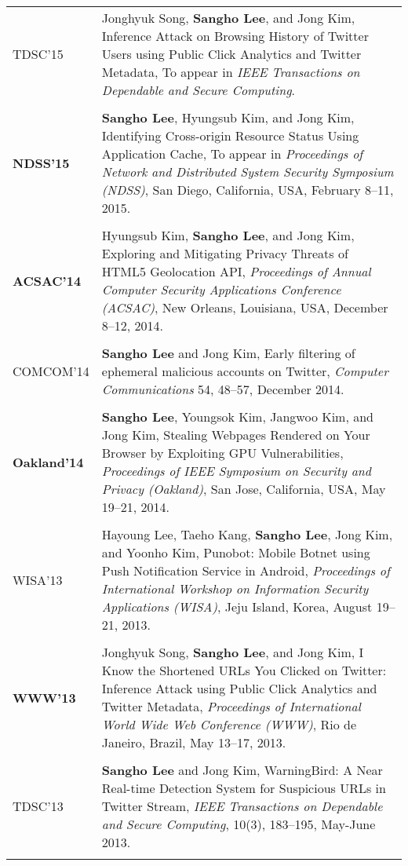 \documentclass[letterpaper]{article}
\begin{document}
\begin{longtable}{@{}p{0.8in}p{5.4in}@{}}
  TDSC'15 & Jonghyuk Song, {\bf Sangho Lee}, and Jong Kim, Inference Attack on Browsing History of Twitter Users using Public Click Analytics and Twitter Metadata, To appear in {\it IEEE Transactions on Dependable and Secure Computing}.\\\\
  \textbf{NDSS'15} & {\bf Sangho Lee}, Hyungsub Kim, and Jong Kim, Identifying Cross-origin Resource Status Using Application Cache, 
  To appear in {\em Proceedings of Network and Distributed System Security Symposium ({NDSS})}, San Diego, California, USA, February 8--11, 2015. \\\\
  \textbf{ACSAC'14} & Hyungsub Kim, {\bf Sangho Lee}, and Jong Kim, Exploring and Mitigating Privacy Threats of HTML5 Geolocation API, 
  {\em Proceedings of Annual Computer Security Applications Conference ({ACSAC})}, New Orleans, Louisiana, USA, December 8--12, 2014. \\\\
  COMCOM'14 & {\bf Sangho Lee} and Jong Kim, Early filtering of ephemeral malicious accounts on Twitter, 
  {\it Computer Communications} 54, 48--57, December 2014.\\\\
  \textbf{Oakland'14} & {\bf Sangho Lee}, Youngsok Kim, Jangwoo Kim, and Jong Kim, Stealing Webpages Rendered on Your Browser by Exploiting GPU Vulnerabilities, \emph{ Proceedings of IEEE Symposium on Security and Privacy ({Oakland})}, San Jose, California, USA, May 19--21, 2014.\\\\
  {WISA'13} & Hayoung Lee, Taeho Kang, {\bf Sangho Lee}, Jong Kim, and Yoonho Kim, Punobot: Mobile Botnet using Push Notification Service in Android, {\it Proceedings of International Workshop on Information Security Applications (WISA)}, Jeju Island, Korea, August 19--21, 2013.\\\\
  \textbf{WWW'13} & Jonghyuk Song, {\bf Sangho Lee}, and Jong Kim, I Know the Shortened URLs You Clicked on Twitter: Inference Attack using Public Click Analytics and Twitter Metadata, \emph{Proceedings of International World Wide Web Conference ({WWW})}, Rio de Janeiro, Brazil, May 13--17, 2013.\\\\
  TDSC'13 & {\bf Sangho Lee} and Jong Kim, WarningBird: A Near Real-time Detection System for Suspicious URLs in Twitter Stream, {\it IEEE Transactions on Dependable and Secure Computing}, 10(3), 183--195, May-June 2013.\\\\

\end{longtable}
\end{document}
